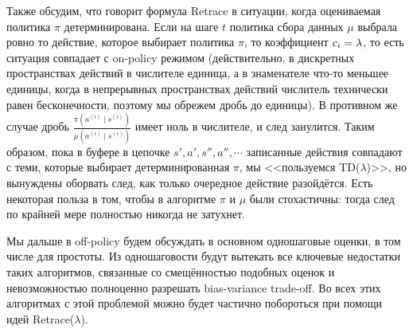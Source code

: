 Также обсудим, что говорит формула Retrace в ситуации, когда оцениваемая политика $\pi$ детерминирована. Если на шаге $t$ политика сбора данных $\mu$ выбрала ровно то действие, которое выбирает политика $\pi$, то коэффициент $c_i \HM= \lambda$, то есть ситуация совпадает с on-policy режимом (действительно, в дискретных пространствах действий в числителе единица, а в знаменателе что-то меньшее единицы, когда в непрерывных пространствах действий числитель технически равен бесконечности, поэтому мы обрежем дробь до единицы). В противном же случае дробь $\frac{\pi(a^{(i)} \mid s^{(i)}) }{\mu(a^{(i)} \mid s^{(i)})}$ имеет ноль в числителе, и след занулится. Таким образом, пока в буфере в цепочке $s', a', s'', a'', \cdots$ записанные действия совпадают с теми, которые выбирает детерминированная $\pi$, мы <<пользуемся TD($\lambda$)>>, но вынуждены оборвать след, как только очередное действие разойдётся. Есть некоторая польза в том, чтобы в алгоритме $\pi$ и $\mu$ были стохастичны: тогда след по крайней мере полностью никогда не затухнет.

Мы дальше в off-policy будем обсуждать в основном одношаговые оценки, в том числе для простоты. Из одношаговости будут вытекать все ключевые недостатки таких алгоритмов, связанные со смещённостью подобных оценок и невозможностью полноценно разрешать bias-variance trade-off. Во всех этих алгоритмах с этой проблемой можно будет частично побороться при помощи идей Retrace($\lambda$).  


